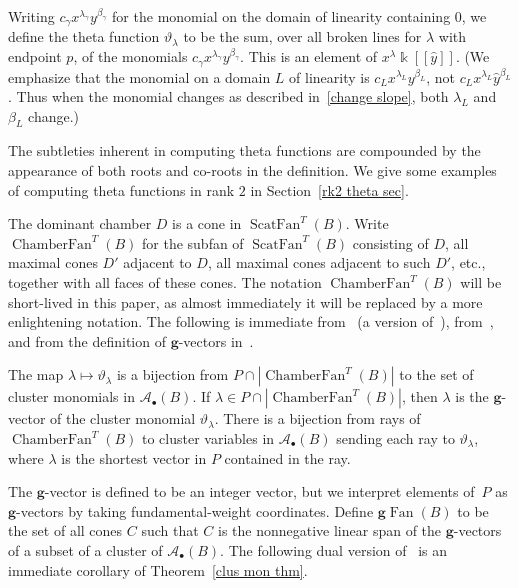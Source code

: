 \documentclass[ALCO,ThmDefs,Unicode,epreuves]{cedram}
\DeclareMathOperator{\Fan}{Fan}
\DeclareMathOperator{\ChamberFan}{ChamberFan}
\DeclareMathOperator{\ScatFan}{ScatFan}
\newcommand{\gFan}{\g\!\Fan}
\newcommand\llbracket{[\![}
\newcommand\rrbracket{]\!]}
\newcommand{\thet}{\vartheta}
\newcommand{\A}{{\mathcal A}}
\newcommand{\g}{\mathbf{g}}
\renewcommand{\k}{\Bbbk}
\newcommand{\hy}{\hat{y}}
\begin{document}
Writing $c_\gamma x^{\lambda_\gamma}y^{\beta_\gamma}$ for the monomial on the domain of linearity containing $0$, we define the theta function $\thet_\lambda$ to be the sum, over all broken lines for $\lambda$ with endpoint $p$, of the monomials $c_\gamma x^{\lambda_\gamma}y^{\beta_\gamma}$.
This is an element of $x^\lambda \k\llbracket \hy\rrbracket $.
(We emphasize that the monomial on a domain $L$ of linearity is $c_Lx^{\lambda_L}y^{\beta_L}$, not $c_Lx^{\lambda_L}\hy^{\beta_L}$.
Thus when the monomial changes as described in~\ref{change slope}, both $\lambda_L$ and $\beta_L$ change.)

The subtleties inherent in computing theta functions are compounded by the appearance of both roots and co-roots in the definition.
We give some examples of computing theta functions in rank $2$ in Section~\ref{rk2 theta sec}.

The dominant chamber $D$ is a cone in $\ScatFan^T(B)$. 
Write $\ChamberFan^T(B)$ for the subfan of $\ScatFan^T(B)$ consisting of $D$, all maximal cones $D'$ adjacent to $D$, all maximal cones adjacent to such $D'$, etc., together with all faces of these cones.
The notation $\ChamberFan^T(B)$ will be short-lived in this paper, as almost immediately it will be replaced by a more enlightening notation.
The following is immediate from~\cite[Theorem~5.2]{scatfan} (a version of~\cite[Theorem~4.9]{GHKK}), from~\cite[Corollary~5.9]{GHKK}, and from the definition of $\g$-vectors in~\cite[Section~6]{ca4}.

\begin{theorem}\label{clus mon thm}
The map $\lambda\mapsto\thet_\lambda$ is a bijection from $P\cap|\ChamberFan^T(B)|$ to the set of cluster monomials in $\A_\bullet(B)$.
If $\lambda\in P\cap|\ChamberFan^T(B)|$, then $\lambda$ is the $\g$-vector of the cluster monomial $\thet_\lambda$.
There is a bijection from rays of $\ChamberFan^T(B)$ to cluster variables in $\A_\bullet(B)$ sending each ray to $\thet_\lambda$, where $\lambda$ is the shortest vector in $P$ contained in the ray.
\end{theorem}

The $\g$-vector is defined to be an integer vector, but we interpret elements of~$P$ as $\g$-vectors by taking fundamental-weight coordinates.
Define $\gFan(B)$ to be the set of all cones $C$ such that $C$ is the nonnegative linear span of the $\g$-vectors of a subset of a cluster of $\A_\bullet(B)$.
The following dual version of~\cite[Theorem~0.8]{GHKK} is an immediate corollary of Theorem~\ref{clus mon thm}.
\end{document}
